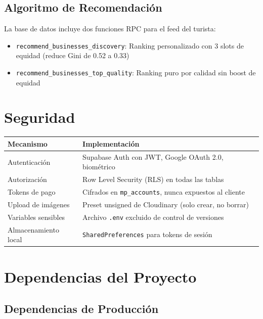 \documentclass[12pt,a4paper]{article}
\begin{document}
\subsection{Algoritmo de Recomendaci\'on}

La base de datos incluye dos funciones RPC para el feed del turista:

\begin{itemize}
    \item \texttt{recommend\_businesses\_discovery}: Ranking personalizado con 3 slots de equidad (reduce Gini de 0.52 a 0.33)
    \item \texttt{recommend\_businesses\_top\_quality}: Ranking puro por calidad sin boost de equidad
\end{itemize}

\section{Seguridad}

\begin{tabularx}{\textwidth}{lX}
\toprule
\textbf{Mecanismo} & \textbf{Implementaci\'on} \\
\midrule
Autenticaci\'on & Supabase Auth con JWT, Google OAuth 2.0, biom\'etrico \\
Autorizaci\'on & Row Level Security (RLS) en todas las tablas \\
Tokens de pago & Cifrados en \texttt{mp\_accounts}, nunca expuestos al cliente \\
Upload de im\'agenes & Preset unsigned de Cloudinary (solo crear, no borrar) \\
Variables sensibles & Archivo \texttt{.env} excluido de control de versiones \\
Almacenamiento local & \texttt{SharedPreferences} para tokens de sesi\'on \\
\bottomrule
\end{tabularx}

\section{Dependencias del Proyecto}

\subsection{Dependencias de Producci\'on}
\end{document}
